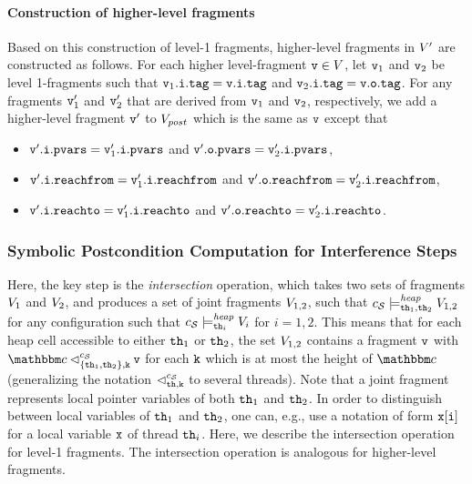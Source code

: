 \paragraph{{\bf Construction of higher-level fragments}}
Based on this construction of level-1 fragments, higher-level fragments
in $V'$ are    constructed as follows.
     For each higher level-fragment $\mathtt{v} \in V$, let
     $\mathtt{v}_1$ and $\mathtt{v}_2$ be level 1-fragments such that
     $\mathtt{v}_1.\mathtt{i}.\mathtt{tag} = \mathtt{v}.\mathtt{i}.\mathtt{tag}$ and
     $\mathtt{v}_2.\mathtt{i}.\mathtt{tag} = \mathtt{v}.\mathtt{o}.\mathtt{tag}$.
     For any fragments $\mathtt{v}_1'$ and $\mathtt{v}_2'$ that are derived from
     $\mathtt{v}_1$ and $\mathtt{v}_2$, respectively, we add a higher-level
     fragment $\mathtt{v}'$ to $V_{post}$
     which is the same as $\mathtt{v}$ except that 
\begin{itemize}
\item $\mathtt{v}'.\mathtt{i}.\mathtt{pvars} = \mathtt{v}_1'.\mathtt{i}.\mathtt{pvars}$ and
$\mathtt{v}'.\mathtt{o}.\mathtt{pvars} = \mathtt{v}_2'.\mathtt{i}.\mathtt{pvars}$,
\item $\mathtt{v}'.\mathtt{i}.\mathtt{reachfrom} = \mathtt{v}_1'.\mathtt{i}.\mathtt{reachfrom}$ and
$\mathtt{v}'.\mathtt{o}.\mathtt{reachfrom} = \mathtt{v}_2'.\mathtt{i}.\mathtt{reachfrom}$,
\item $\mathtt{v}'.\mathtt{i}.\mathtt{reachto} = \mathtt{v}_1'.\mathtt{i}.\mathtt{reachto}$ and
$\mathtt{v}'.\mathtt{o}.\mathtt{reachto} =  \mathtt{v}_2'.\mathtt{i}.\mathtt{reachto}$.
\end{itemize}



\subsubsection{Symbolic Postcondition Computation for Interference Steps} 
Here, the key step is the {\em intersection} operation, which
takes two sets of fragments
$V_1$ and $V_2$, and produces a set of joint fragments
$V_{1,2}$, such that
$c_{\mathcal S} \models_{{\tt th}_1,{\tt th}_2}^{\mathit{heap}} V_{1,2}$ for any configuration
such that
$c_{\mathcal S} \models_{{\tt th}_i}^{\mathit{heap}} V_i$ for $i=1,2$.
This means that for each heap cell accessible to either
${\tt th}_1$ or ${\tt th}_2$, the set $V_{1,2}$ 
contains a fragment $\mathtt{v}$ with $\cell \lsatfrag{\klevel}{\{\thread_1,\thread_2\}}{\sconf} \frag$ for each ${\tt k}$ which is at most the height of $\cell$
(generalizing the notation  $\lhd_{{\tt th},{\tt k}}^{c_{\mathcal S}}$ to several
threads).
Note that a joint fragment represents local pointer variables of
both ${\tt th}_1$ and ${\tt th}_2$. In order to distinguish
between local variables of ${\tt th}_1$ and ${\tt th}_2$, one can, e.g.,
use a notation of form
$\mathtt{x[i]}$ for a local variable $\mathtt{x}$ of thread ${\tt th}_i$.
Here, we describe the intersection operation for level-1 fragments. The
intersection operation is analogous for higher-level fragments.

